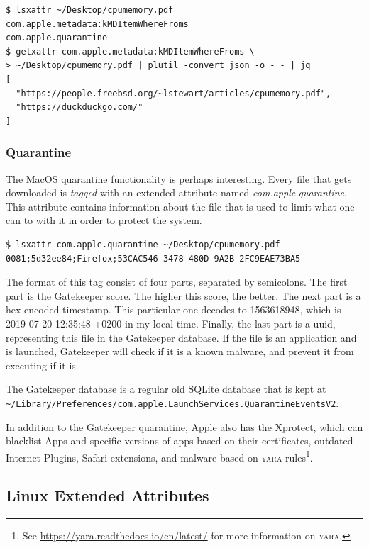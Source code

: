 \documentclass[a4paper]{article}
\begin{document}

\begin{verbatim}
$ lsxattr ~/Desktop/cpumemory.pdf
com.apple.metadata:kMDItemWhereFroms
com.apple.quarantine
$ getxattr com.apple.metadata:kMDItemWhereFroms \
> ~/Desktop/cpumemory.pdf | plutil -convert json -o - - | jq
[
  "https://people.freebsd.org/~lstewart/articles/cpumemory.pdf",
  "https://duckduckgo.com/"
]
\end{verbatim}

\subsubsection{Quarantine}

The MacOS quarantine functionality is perhaps interesting. Every file that gets downloaded is \emph{tagged} with an extended attribute named \emph{com.apple.quarantine}. This attribute contains information about the file that is used to limit what one can to with it in order to protect the system.

\begin{verbatim}
$ lsxattr com.apple.quarantine ~/Desktop/cpumemory.pdf
0081;5d32ee84;Firefox;53CAC546-3478-480D-9A2B-2FC9EAE73BA5
\end{verbatim}
The format of this tag consist of four parts, separated by semicolons. The first part is the Gatekeeper score. The higher this score, the better. The next part is a hex-encoded timestamp. This particular one decodes to 1563618948, which is 2019-07-20 12:35:48 +0200 in my local time. Finally, the last part is a \gls{uuid}, representing this file in the Gatekeeper database. If the file is an application and is launched, Gatekeeper will check if it is a known malware, and prevent it from executing if it is.

The Gatekeeper database is a regular old SQLite database that is kept at \texttt{\textasciitilde/Library/Preferences/com.apple.LaunchServices.QuarantineEventsV2}.


In addition to the Gatekeeper quarantine, Apple also has the Xprotect, which can blacklist Apps and specific versions of apps based on their certificates, outdated Internet Plugins, Safari extensions, and malware based on \textsc{yara} rules\footnote{See \url{https://yara.readthedocs.io/en/latest/} for more information on \textsc{yara}.}.

\subsection{Linux Extended Attributes}
\end{document}

